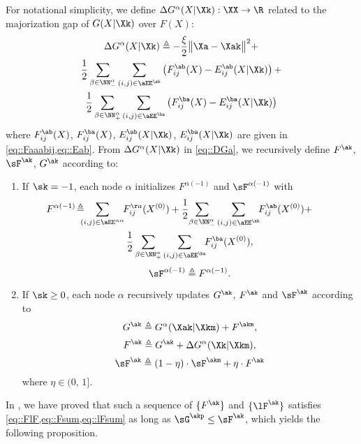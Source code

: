 { For notational simplicity, we define $\Delta G^\alpha(X|\Xk):\XX\rightarrow\R$ related to the majorization gap of  $G(X|\Xk)$ over $F(X)$:
	\vspace{-0.5em}
\begin{multline}\label{eq::DGa}
	\Delta G^\alpha(X|\Xk)\triangleq -
	\frac{\xi}{2} \big\|\Xa-\Xak\big\|^2 + \\
	\frac{1}{2}\sum_{\beta\in\NN_-^{\alpha}}\sum_{(i,j)\in \aEE^{\ab}}\left(F_{ij}^{\ab}(X)-E_{ij}^{\ab}(X|\Xk)\right)+\\
	\frac{1}{2}\sum_{\beta\in\NN_+^{\alpha}}\sum_{(i,j)\in \aEE^{\ba}}\left(F_{ij}^{\ba}(X)-E_{ij}^{\ba}(X|\Xk)\right)
\end{multline}
where $F_{ij}^{\ab}(X)$, $F_{ij}^{\ba}(X)$, $E_{ij}^{\ab}(X|\Xk)$, $E_{ij}^{\ba}(X|\Xk)$  are given in \cref{eq::Faaabij,eq::Eab}. From $\Delta G^\alpha(X|\Xk)$ in \cref{eq::DGa}, we recursively define $F^{\ak}$, $\sF^{\ak}$, $G^{\ak}$ according to:
\begin{enumerate}[leftmargin=0.45cm]
\item If $\sk=-1$, each node $\alpha$ initializes $F^{\alpha(-1)}$ and $\sF^{\alpha(-1)}$ with
\vspace{-0.75em}
\begin{multline}\label{eq::Fa0}
\!\!\!\!\!\!\!\!\!\!\!\!\!	F^{\alpha(-1)} \!\triangleq \!\!\!\!\sum_{(i,j)\in \aEE^{\alpha\alpha}}\!\! F_{ij}^{\aa}(X^{(0)})+	\frac{1}{2}
\!\sum_{\beta\in\NN_-^{\alpha}}\sum_{(i,j)\in \aEE^{\ab}}\!\! F_{ij}^{\ab}(X^{(0)}) +\\
	\frac{1}{2}\sum_{\beta\in\NN_+^{\alpha}}\sum_{(i,j)\in \aEE^{\ba}}\!\! F_{ij}^{\ba}(X^{(0)}),
\end{multline}
\begin{equation}\label{eq::sFa0}
	\sF^{\alpha(-1)}\triangleq F^{\alpha(-1)}.
\end{equation}
\item If $\sk\geq 0$, each node $\alpha$ recursively updates $G^{\ak}$, $F^{\ak}$ and $\sF^{\ak}$  according to
\begin{equation}\label{eq::Gakp}
	G^{\ak} \triangleq G^\alpha(\Xak|\Xkm) + F^{\akm},
\end{equation}
\begin{equation}\label{eq::Fakp}
	F^{\ak} \triangleq G^{\ak} +  \Delta G^\alpha(\Xk|\Xkm),
\end{equation}
\begin{equation}\label{eq::lFakp}
	\sF^{\ak}  \triangleq (1-\eta)\cdot\sF^{\akm} + \eta\cdot F^{\ak}
\end{equation}
where $\eta\in(0,\,1]$.\\[-1em]  
\end{enumerate}
In , we have proved that such a sequence of $\{F^{\ak}\}$ and $\{\lF^{\ak}\}$ satisfies \cref{eq::FlF,eq::Fsum,eq::lFsum} as long as $\sG^{\akp} \leq \sF^{\ak}$, which yields the following proposition.}

